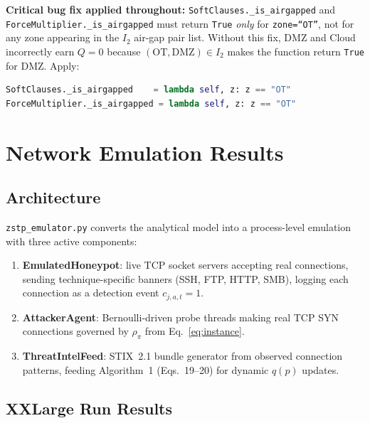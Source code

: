 \documentclass[12pt,a4paper]{article}
\begin{document}
\begin{warning}
\textbf{Critical bug fix applied throughout:} \texttt{SoftClauses.\_is\_airgapped} and
\texttt{ForceMultiplier.\_is\_airgapped} must return \texttt{True} \emph{only} for
\texttt{zone=``OT''}, not for any zone appearing in the $I_2$ air-gap pair list.
Without this fix, DMZ and Cloud incorrectly earn $Q{=}0$ because
$(\text{OT},\text{DMZ})\in I_2$ makes the function return \texttt{True} for DMZ.
Apply:
\begin{lstlisting}[language=Python]
SoftClauses._is_airgapped    = lambda self, z: z == "OT"
ForceMultiplier._is_airgapped = lambda self, z: z == "OT"
\end{lstlisting}
\end{warning}

\section{Network Emulation Results}
\label{sec:emulation}

\subsection{Architecture}

\texttt{zstp\_emulator.py} converts the analytical model into a process-level emulation
with three active components:

\begin{enumerate}[leftmargin=*, noitemsep]
  \item \textbf{EmulatedHoneypot}: live TCP socket servers accepting real connections,
        sending technique-specific banners (SSH, FTP, HTTP, SMB), logging each
        connection as a detection event $c_{j,a,t}=1$.
  \item \textbf{AttackerAgent}: Bernoulli-driven probe threads making real TCP SYN
        connections governed by $\rho_\pi$ from Eq.~\eqref{eq:instance}.
  \item \textbf{ThreatIntelFeed}: STIX~2.1 bundle generator from observed connection
        patterns, feeding Algorithm~1 (Eqs.~19--20) for dynamic $q(p)$ updates.
\end{enumerate}

\subsection{XXLarge Run Results}
\end{document}
